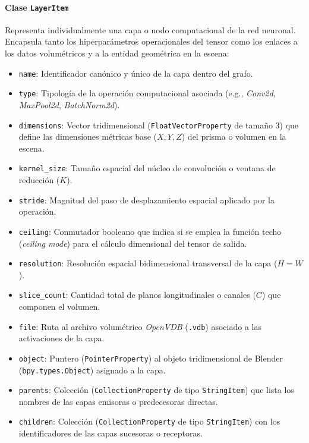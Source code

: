 \paragraph{Clase \texttt{LayerItem}}
Representa individualmente una capa o nodo computacional de la red neuronal. Encapsula tanto los hiperparámetros 
operacionales del tensor como los enlaces a los datos volumétricos y a la entidad geométrica en la escena:
\begin{itemize}
    \item \texttt{name}: Identificador canónico y único de la capa dentro del grafo.
    \item \texttt{type}: Tipología de la operación computacional asociada (e.g., \textit{Conv2d}, \textit{MaxPool2d}, \textit{BatchNorm2d}).
    \item \texttt{dimensions}: Vector tridimensional (\texttt{FloatVectorProperty} de tamaño 3) que define las dimensiones métricas base ($X, Y, Z$) del prisma o volumen en la escena.
    \item \texttt{kernel\_size}: Tamaño espacial del núcleo de convolución o ventana de reducción ($K$).
    \item \texttt{stride}: Magnitud del paso de desplazamiento espacial aplicado por la operación.
    \item \texttt{ceiling}: Conmutador booleano que indica si se emplea la función techo (\textit{ceiling mode}) para el cálculo dimensional del tensor de salida.
    \item \texttt{resolution}: Resolución espacial bidimensional transversal de la capa ($H = W$).
    \item \texttt{slice\_count}: Cantidad total de planos longitudinales o canales ($C$) que componen el volumen.
    \item \texttt{file}: Ruta al archivo volumétrico \textit{OpenVDB} (\texttt{.vdb}) asociado a las activaciones de la capa.
    \item \texttt{object}: Puntero (\texttt{PointerProperty}) al objeto tridimensional de Blender (\texttt{bpy.types.Object}) asignado a la capa.
    \item \texttt{parents}: Colección (\texttt{CollectionProperty} de tipo \texttt{StringItem}) que lista los nombres de las capas emisoras o predecesoras directas.
    \item \texttt{children}: Colección (\texttt{CollectionProperty} de tipo \texttt{StringItem}) con los identificadores de las capas sucesoras o receptoras.
\end{itemize}

